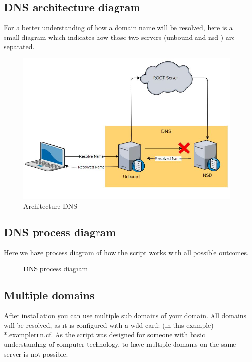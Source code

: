 \subsection{DNS architecture diagram}
For a better understanding of how a domain name will be resolved, here is a small diagram which indicates how those two servers (unbound and nsd \cite{nlnet-labs}) are separated.
\begin{figure}[H]
	\centering
	\includegraphics[width=0.9\linewidth]{diagram/dns_arch_diagramm.JPG}
	\caption{Architecture DNS}
	\label{fig:beforeWeb}
\end{figure}
\newpage
\subsection{DNS process diagram}
Here we have process diagram of how the script works with all possible outcomes.

\begin{figure}[H]
	\usetikzlibrary{shapes,arrows,calc}
	\centering
	
	\caption{DNS process diagram}
\end{figure}

\subsection{Multiple domains}
After installation you can use multiple sub domains of your domain. All domains will be resolved, as it is configured with a \gls{wild-card}: (in this example) *.examplerun.cf. As the script was designed for someone with basic understanding of computer technology, to have multiple domains on the same server is not possible.

\newpage
